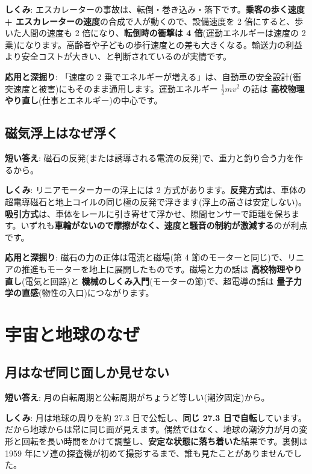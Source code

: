 \documentclass{article}
\begin{document}
\textbf{しくみ}: エスカレーターの事故は、転倒・巻き込み・落下です。\textbf{乗客の歩く速度 + エスカレーターの速度}の合成で人が動くので、設備速度を 2 倍にすると、歩いた人間の速度も 2 倍になり、\textbf{転倒時の衝撃は 4 倍}(運動エネルギーは速度の 2 乗)になります。高齢者や子どもの歩行速度との差も大きくなる。輸送力の利益より安全コストが大きい、と判断されているのが実情です。

\textbf{応用と深掘り}: 「速度の 2 乗でエネルギーが増える」は、自動車の安全設計(衝突速度と被害)にもそのまま通用します。運動エネルギー \( \frac{1}{2}mv^{2} \) の話は \textbf{高校物理やり直し}(仕事とエネルギー)の中心です。

\subsection{磁気浮上はなぜ浮く}

\textbf{短い答え}: 磁石の反発(または誘導される電流の反発)で、重力と釣り合う力を作るから。

\textbf{しくみ}: リニアモーターカーの浮上には 2 方式があります。\textbf{反発方式}は、車体の超電導磁石と地上コイルの同じ極の反発で浮きます(浮上の高さは安定しない)。\textbf{吸引方式}は、車体をレールに引き寄せて浮かせ、隙間センサーで距離を保ちます。いずれも\textbf{車輪がないので摩擦がなく、速度と騒音の制約が激減する}のが利点です。

\textbf{応用と深掘り}: 磁石の力の正体は電流と磁場(第 4 節のモーターと同じ)で、リニアの推進もモーターを地上に展開したものです。磁場と力の話は \textbf{高校物理やり直し}(電気と回路)と \textbf{機械のしくみ入門}(モーターの節)で、超電導の話は \textbf{量子力学の直感}(物性の入口)につながります。

\section{宇宙と地球のなぜ}

\subsection{月はなぜ同じ面しか見せない}

\textbf{短い答え}: 月の自転周期と公転周期がちょうど等しい(潮汐固定)から。

\textbf{しくみ}: 月は地球の周りを約 27.3 日で公転し、\textbf{同じ 27.3 日で自転}しています。だから地球からは常に同じ面が見えます。偶然ではなく、地球の潮汐力が月の変形と回転を長い時間をかけて調整し、\textbf{安定な状態に落ち着いた}結果です。裏側は 1959 年にソ連の探査機が初めて撮影するまで、誰も見たことがありませんでした。
\end{document}
